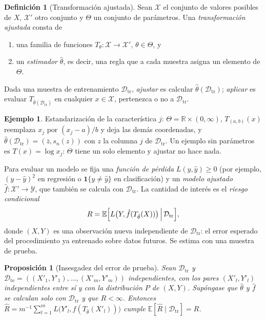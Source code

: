 \documentclass[11pt,a4paper]{article}
\theoremstyle{plain}
\newtheorem{proposicion}[teorema]{Proposición}
\theoremstyle{definition}
\newtheorem{definicion}[teorema]{Definición}
\newtheorem{ejemplo}[teorema]{Ejemplo}
\theoremstyle{remark}
\newcommand{\R}{\mathbb{R}}
\newcommand{\E}{\mathbb{E}}
\newcommand{\1}{\mathbf{1}}
\newcommand{\ind}[1]{\mathbf{1}\{#1\}}
\newcommand{\Dtr}{\mathcal D_{\mathrm{tr}}}
\newcommand{\Dte}{\mathcal D_{\mathrm{te}}}
\begin{document}
\begin{definicion}[Transformación ajustada]\label{def:ajustada}
Sean $\mathcal X$ el conjunto de valores posibles de $X$, $\mathcal X'$
otro conjunto y $\Theta$ un conjunto de parámetros. Una \emph{transformación
ajustada} consta de
\begin{enumerate}[label=(\roman*)]
\item una familia de funciones $T_\theta:\mathcal X\to\mathcal X'$,
$\theta\in\Theta$, y
\item un \emph{estimador} $\hat\theta$, es decir, una regla que a cada
muestra asigna un elemento de $\Theta$.
\end{enumerate}
Dada una muestra de entrenamiento $\Dtr$, \emph{ajustar} es calcular
$\hat\theta(\Dtr)$; \emph{aplicar} es evaluar $T_{\hat\theta(\Dtr)}$ en
cualquier $x\in\mathcal X$, pertenezca o no a $\Dtr$.
\end{definicion}

\begin{ejemplo}
Estandarización de la característica $j$: $\Theta=\R\times(0,\infty)$,
$T_{(a,b)}(x)$ reemplaza $x_j$ por $(x_j-a)/b$ y deja las demás
coordenadas, y $\hat\theta(\Dtr)=(\bar z,s_n(z))$ con $z$ la columna $j$
de $\Dtr$. Un ejemplo sin parámetros es $T(x)=\log x_j$: $\Theta$ tiene un
solo elemento y ajustar no hace nada.
\end{ejemplo}

Para evaluar un modelo se fija una \emph{función de pérdida}
$L(y,\hat y)\ge0$ (por ejemplo, $(y-\hat y)^2$ en regresión o
$\ind{y\ne\hat y}$ en clasificación) y un \emph{modelo ajustado}
$\hat f:\mathcal X'\to\mathcal Y$, que también se calcula con $\Dtr$. La
cantidad de interés es el \emph{riesgo condicional}
\[
R=\E\Bigl[L\bigl(Y,\hat f(T_{\hat\theta}(X))\bigr)\,\Big|\,\Dtr\Bigr],
\]
donde $(X,Y)$ es una observación nueva independiente de $\Dtr$: el error
esperado del procedimiento ya entrenado sobre datos futuros. Se estima con
una muestra de prueba.

\begin{proposicion}[Insesgadez del error de prueba]\label{prop:test}
Sean $\Dtr$ y $\Dte=((X'_1,Y'_1),\dots,(X'_m,Y'_m))$ independientes, con
los pares $(X'_l,Y'_l)$ independientes entre sí y con la distribución $P$
de $(X,Y)$. Supóngase que $\hat\theta$ y $\hat f$ se calculan solo con
$\Dtr$ y que $R<\infty$. Entonces
$\hat R=m^{-1}\sum_{l=1}^mL\bigl(Y'_l,\hat f(T_{\hat\theta}(X'_l))\bigr)$
cumple $\E[\hat R\mid\Dtr]=R$.
\end{proposicion}
\end{document}
